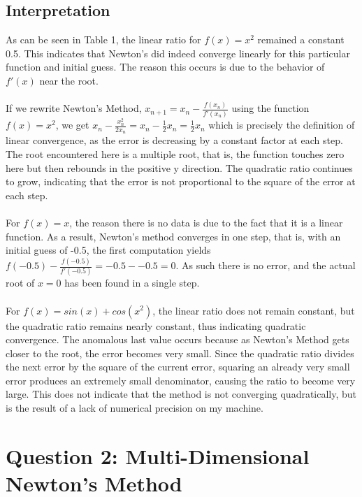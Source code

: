 \documentclass[12pt]{article}
\begin{document}
\subsection{Interpretation} 
As can be seen in Table 1, the linear ratio for $f(x) = x^2$ remained a constant 0.5. This indicates that Newton's did indeed converge linearly for this particular function and initial guess. The reason this occurs is due to the behavior of $f'(x)$ near the root. \\\\If we rewrite Newton's Method, $x_{n+1} = x_n - \frac{f(x_n)}{f'(x_n)}$ using the function \\$f(x) = x^2$, we get $x_n - \frac{x^2_n}{2x_n} = x_n - \frac{1}{2}x_n = \frac{1}{2}x_n$ which is precisely the definition of linear convergence, as the error is decreasing by a constant factor at each step. The root encountered here is a multiple root, that is, the function touches zero here but then rebounds in the positive y direction. The quadratic ratio continues to grow, indicating that the error is not proportional to the square of the error at each step. \\\\For $f(x) = x$, the reason there is no data is due to the fact that it is a linear function. As a result, Newton's method converges in one step, that is, with an initial guess of -0.5, the first computation yields \\$f(-0.5) - \frac{f(-0.5)}{f'(-0.5)} = -0.5 - -0.5 = 0$. As such there is no error, and the actual root of $x = 0$ has been found in a single step. \\ \\For $f(x) = sin(x) + cos(x^2)$, the linear ratio does not remain constant, but the quadratic ratio remains nearly constant, thus indicating quadratic convergence. The anomalous last value occurs because as Newton's Method gets closer to the root, the error becomes very small. Since the quadratic ratio divides the next error by the square of the current error, squaring an already very small error produces an extremely small denominator, causing the ratio to become very large. This does not indicate that the method is not converging quadratically, but is the result of a lack of numerical precision on my machine.

\section{Question 2: Multi-Dimensional Newton's Method}
\end{document}
